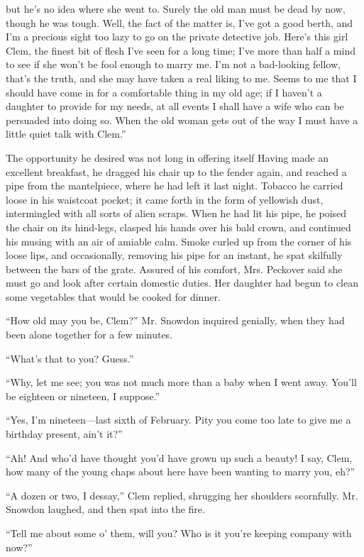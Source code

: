 but he's no idea where she went to. Surely the old man must be dead by
now, though he was tough. Well, the fact of the matter is, I've got a
good berth, and I'm a precious sight too lazy to go on the private
detective job. Here's this girl Clem, the finest bit of flesh I've seen
for a long time; I've more than half a mind to see if she won't be fool
enough to marry {}me. I'm not a bad-looking fellow, that's the truth,
and she may have taken a real liking to me. Seems to me that I should
have come in for a comfortable thing in my old age; if I haven't a
daughter to provide for my needs, at all events I shall have a wife who
can be persuaded into doing so. When the old woman gets out of the way I
must have a little quiet talk with Clem.''

The opportunity he desired was not long in offering itself Having made
an excellent breakfast, he dragged his chair up to the fender again, and
reached a pipe from the mantelpiece, where he had left it last night.
Tobacco he carried loose in his waistcoat pocket; it came forth in the
form of yellowish dust, intermingled with all sorts of alien scraps.
When he had lit his pipe, he poised the chair on its hind-legs, clasped
his hands over his bald crown, and continued his musing with an air of
amiable calm. Smoke curled up from the corner of his loose lips, and
occasionally, removing his pipe for an instant, he spat skilfully
between the bars {}of the grate. Assured of his comfort, Mrs. Peckover
said she must go and look after certain domestic duties. Her daughter
had begun to clean some vegetables that would be cooked for dinner.

``How old may you be, Clem?'' Mr. Snowdon inquired genially, when they
had been alone together for a few minutes.

``What's that to you? Guess.''

``Why, let me see; you was not much more than a baby when I went away.
You'll be eighteen or nineteen, I suppose.''

``Yes, I'm nineteen---last sixth of February. Pity you come too late to
give me a birthday present, ain't it?''

``Ah! And who'd have thought you'd have grown up such a beauty! I say,
Clem, how many of the young chaps about here have been wanting to marry
you, eh?''

``A dozen or two, I dessay,'' Clem replied, shrugging her shoulders
scornfully. Mr. Snowdon laughed, and then spat into the fire.

``Tell me about some o' them, will you? {}Who is it you're keeping
company with now?''

